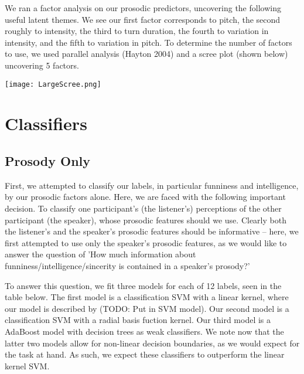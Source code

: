 \documentclass[11pt]{article}
\begin{document}

We ran a factor analysis on our prosodic predictors, uncovering the following useful latent themes.  We see our first factor corresponds to pitch, the second roughly to intensity, the third to turn duration, the fourth to variation in intensity, and the fifth to variation in pitch. To determine the number of factors to use, we used parallel analysis (Hayton 2004) and a scree plot (shown below) uncovering 5 factors.

\begin{center}
\texttt{[image: LargeScree.png]}
\end{center}

\section{Classifiers}
\subsection{Prosody Only}
First, we attempted to classify our labels, in particular funniness and intelligence, by our prosodic factors alone.  Here, we are faced with the following important decision.  To classify one participant's (the listener's) perceptions of the other participant (the speaker), whose prosodic features should we use.  Clearly both the listener's and the speaker's prosodic features should be informative -- here, we first attempted to use only the speaker's prosodic features, as we would like to answer the question of 'How much information about funniness/intelligence/sincerity is contained in a speaker's prosody?'

To answer this question, we fit three models for each of 12 labels, seen in the table below.  The first model is a classification SVM with a linear kernel, where our model is described by (TODO: Put in SVM model).  Our second model is a classification SVM with a radial basis fuction kernel.  Our third model is a AdaBoost model with decision trees as weak classifiers.  We note now that the latter two models allow for non-linear decision boundaries, as we would expect for the task at hand.  As such, we expect these classifiers to outperform the linear kernel SVM. 
\end{document}
